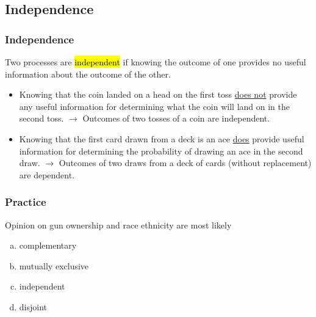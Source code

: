 
\subsection{Independence}


\begin{frame}
\frametitle{Independence}

Two processes are \hl{independent} if knowing the outcome of one provides no useful information about the outcome of the other.

\pause

\begin{itemize}

\item Knowing that the coin landed on a head on the first toss \underline{does not} provide any useful information for determining what the coin will land on in the second toss. $\rightarrow$ Outcomes of two tosses of a coin are independent.

\pause

\item Knowing that the first card drawn from a deck is an ace \underline{does} provide useful information for determining the probability of drawing an ace in the second draw. $\rightarrow$ Outcomes of two draws from a deck of cards (without replacement) are dependent.

\end{itemize}

\end{frame}


\begin{frame}
\frametitle{Practice}


Opinion on gun ownership and race ethnicity are most likely
\begin{enumerate}[(a)]
\item complementary
\item mutually exclusive
\item independent
\item disjoint
\end{enumerate}


\end{frame}


